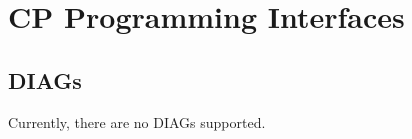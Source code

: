 \chapter{CP Programming Interfaces}
\label{chap:prog}
\section{DIAGs}
Currently, there are no DIAGs supported.

